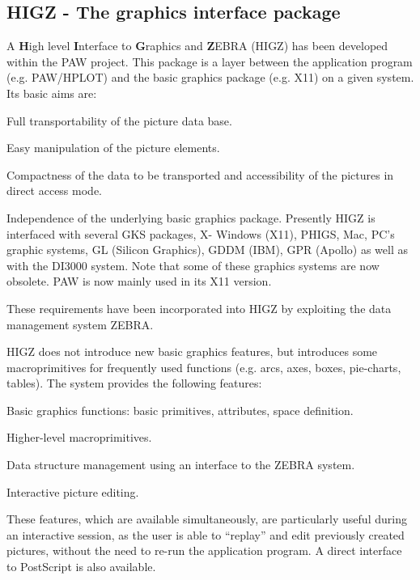 \subsection{HIGZ - The graphics interface package}

A {\bf H}igh level
{\bf I}nterface to {\bf G}raphics and {\bf Z}EBRA
(HIGZ) has been developed within the PAW project. This package is
a layer between the application program (e.g. PAW/HPLOT) and the basic
graphics package (e.g. X11) on a given system. Its basic aims are:

\begin{UL}
\item Full transportability of the picture data base.
\item Easy manipulation of the picture elements.
\item Compactness of the data to be transported and accessibility
      of the pictures in direct access mode.
\item Independence of the underlying basic graphics package.
      Presently HIGZ is interfaced with several GKS packages,
      X- Windows (X11), PHIGS, Mac, PC's graphic systems, 
      GL (Silicon Graphics), GDDM (IBM),
      GPR (Apollo) as well as with the DI3000 system. Note that some of these
      graphics systems are now obsolete. PAW is now mainly used in its X11 
      version.
\end{UL}

These requirements have been incorporated into HIGZ by exploiting
the data management system ZEBRA.
 
HIGZ does not introduce new basic graphics features, but introduces
some macroprimitives for frequently used functions
(e.g. arcs, axes, boxes, pie-charts, tables). The system
provides the following features:

\begin{UL}
\item Basic graphics functions: basic primitives, attributes, space definition.
\item Higher-level macroprimitives.
\item Data structure management using an interface to the ZEBRA system.
\item Interactive picture editing.
\end{UL}

These features, which are available simultaneously, are
particularly useful during
an interactive session, as the user is able to
``replay'' and edit previously created pictures, without the need to re-run
the application program. 
A direct interface to PostScript is also
available.

